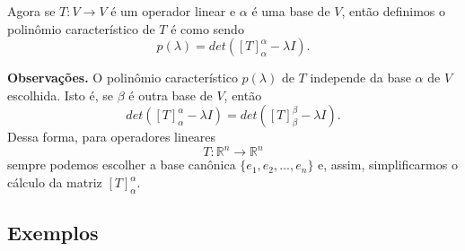 Agora se $T:  V \rightarrow V$ é um operador linear e $\alpha$ é uma base de $V$, então definimos o polinômio característico de $T$ é como sendo $$p(\lambda)=det([T]_{\alpha}^{\alpha}-\lambda I).$$


\vspace{0.7cm}
\noindent \textbf{Observações.} O polinômio característico $p(\lambda)$ de $T$ independe da base $\alpha$ de $V$ escolhida.  Isto é, se $\beta$ é outra base de $V$, então $$det([T]_{\alpha}^{\alpha}-\lambda I)= det([T]_{\beta}^{\beta}-\lambda I).$$  Dessa forma, para operadores  lineares $$T: \mathbb{R}^n \rightarrow \mathbb{R}^n$$ sempre  podemos escolher a base canônica $\{ e_1, e_2,..., e_n\}$ e, assim,  simplificarmos o cálculo da matriz $[T]_{\alpha}^{\alpha}$.


\subsection{Exemplos}
